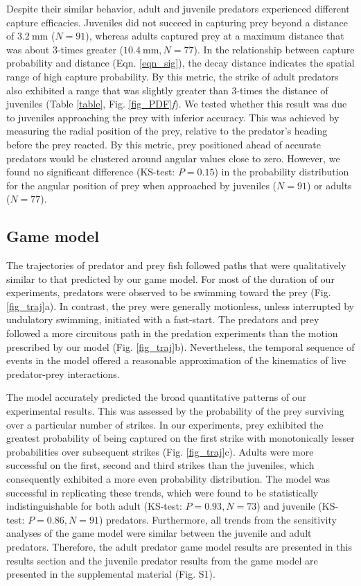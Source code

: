 \documentclass[]{rsos}%
\begin{document}
Despite their similar behavior, adult and juvenile predators experienced different capture efficacies.
Juveniles did not succeed in capturing prey beyond a distance of $\SI{3.2}{\mm}$ ($N = 91$), whereas adults captured prey at a maximum distance that was about 3-times greater ($\SI{10.4}{\mm}, N = 77$).
In the relationship between capture probability and distance (Eqn. \ref{eqn_sig}), the decay distance indicates the spatial range of high capture probability. 
By this metric, the strike of adult predators also exhibited a range that was slightly greater than 3-times the distance of juveniles (Table \ref{table}, Fig. \ref{fig_PDF}\textit{f}).
We tested whether this result was due to juveniles approaching the prey with inferior accuracy.
This was achieved by measuring the radial position of the prey, relative to the predator's heading before the prey reacted.
By this metric, prey positioned ahead of accurate predators would be clustered around angular values close to zero. 
However, we found no significant difference (KS-test: $P = 0.15$) in the probability distribution for the angular position of prey when approached by juveniles ($N = 91$) or adults ($N = 77$).


\subsection{Game model} %
The trajectories of predator and prey fish followed paths that were qualitatively similar to that predicted by our game model.
For most of the duration of our experiments, predators were observed to be swimming toward the prey (Fig. \ref{fig_traj}a). 
In contrast, the prey were generally motionless, unless interrupted by undulatory swimming, initiated with a fast-start.
The predators and prey followed a more circuitous path in the predation experiments than the motion prescribed by our model (Fig. \ref{fig_traj}b).
Nevertheless, the temporal sequence of events in the model offered a reasonable approximation of the kinematics of live predator-prey interactions.

The model accurately predicted the broad quantitative patterns of our experimental results.
This was assessed by the probability of the prey surviving over a particular number of strikes. 
In our experiments, prey exhibited the greatest probability of being captured on the first strike with monotonically lesser probabilities over subsequent strikes (Fig. \ref{fig_traj}c).
Adults were more successful on the first, second and third strikes than the juveniles, which consequently exhibited a more even probability distribution.
The model was successful in replicating these trends, which were found to be statistically indistinguishable for both adult (KS-test: $P = 0.93, N = 73$) and juvenile (KS-test: $P = 0.86, N = 91$) predators. 
Furthermore, all trends from the sensitivity analyses of the game model were similar between the juvenile and adult predators. 
Therefore, the adult predator game model results are presented in this results section and the juvenile predator results from the game model are presented in the supplemental material (Fig. S1).
\end{document}
